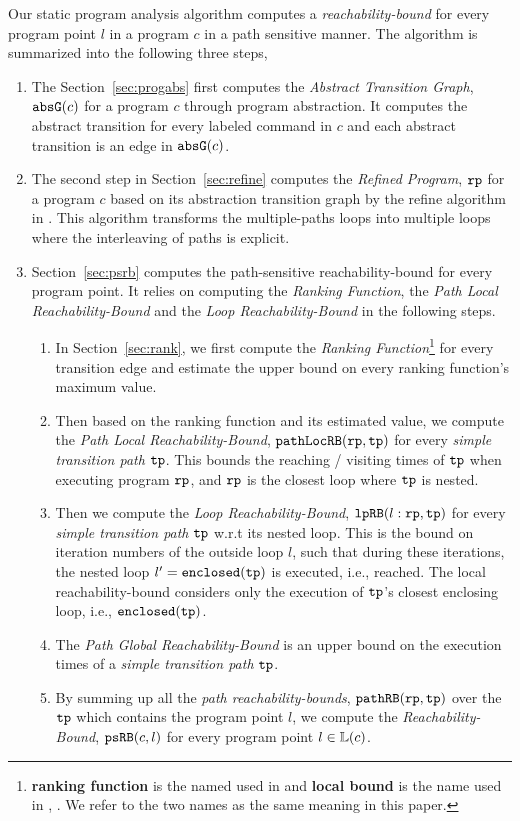 Our static program analysis algorithm computes 
a \emph{reachability-bound} for every program point $l$ in a program $c$ in a path sensitive manner.
The algorithm is summarized into the following three steps,
\begin{enumerate}
\item  The Section~\ref{sec:progabs} first 
computes the \emph{Abstract Transition Graph}, $\mathtt{abs}{\mathtt{G}}(c)$ for a program $c$ through program abstraction.
It computes the abstract transition 
for every labeled command in $c$ and each abstract transition is an edge in $\mathtt{abs}{\mathtt{G}}(c)$.
\item The second step in Section~\ref{sec:refine}
computes the \emph{Refined Program}, $\mathtt{rp}$ for a program $c$ based on 
its abstraction transition graph by the refine algorithm in \cite{GulwaniJK09}.
This algorithm transforms the multiple-paths loops
into multiple loops where
the interleaving of paths is explicit.
\item Section~\ref{sec:psrb} computes the path-sensitive reachability-bound for every program point.
It relies on computing the \emph{Ranking Function}, the \emph{Path Local Reachability-Bound} and the \emph{Loop Reachability-Bound}  in the following steps.
\begin{enumerate}
    \item In Section~\ref{sec:rank}, we first compute the \emph{Ranking Function}\footnote{\textbf{ranking function} is the named used in \cite{SinnZV14}
    and \textbf{local bound} is the name used in \cite{ZulegerGSV11}, \cite{sinn2017complexity}.
    We refer to the two names as the same meaning in this paper.}  for every transition edge 
    and estimate the upper bound on every ranking function's maximum value.
    \item Then based on the ranking function and its estimated value, we compute the \emph{Path Local Reachability-Bound}, $\mathtt{pathLocRB}(\mathtt{rp}, \mathtt{tp})$ for every \emph{simple transition path} $\mathtt{tp}$. 
    This bounds the reaching / visiting times of $\mathtt{tp}$ when executing program $\mathtt{rp}$, and $\mathtt{rp}$ is the closest loop where $\mathtt{tp}$ is nested.
    \item Then we compute the \emph{Loop Reachability-Bound}, $\mathtt{lpRB}(l: \mathtt{rp}, \mathtt{tp})$ for every \emph{simple transition path} $\mathtt{tp}$
    w.r.t its nested loop. 
    This is the bound on iteration numbers of the outside loop $l$,
    such that during these iterations, the nested loop $l' = \mathtt{enclosed(\mathtt{tp})}$ is executed, i.e., reached.
    The local reachability-bound  considers only the execution of $\mathtt{tp}$'s closest enclosing loop, i.e., $\mathtt{enclosed}(\mathtt{tp})$.
    \item The \emph{Path Global Reachability-Bound} is an upper bound on the execution times of a \emph{simple transition path} $\mathtt{tp}$.
    \item By summing up all the \emph{path reachability-bounds}, $\mathtt{pathRB}(\mathtt{rp}, \mathtt{tp})$ over the $\mathtt{tp}$ which contains the program point $l$, we compute the \emph{Reachability-Bound}, $\mathtt{psRB}(c, l)$ for every program point $l \in \mathbb{L}(c)$.
\end{enumerate}
\end{enumerate}
